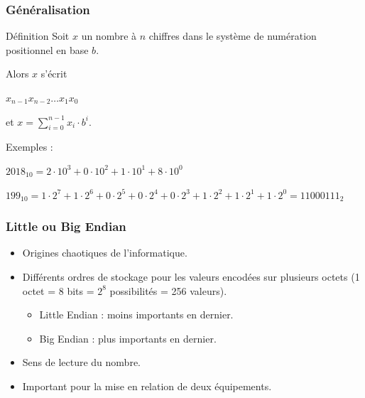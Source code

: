 	\frame
	{
		\frametitle{G\'en\'eralisation}
		\begin{block}{D\'efinition}
			Soit $x$ un nombre \`a $n$ chiffres dans le syst\`eme de num\'eration positionnel en base $b$.
			
			Alors $x$ s'\'ecrit
			
			$x_{n-1}x_{n-2}\ldots x_1x_0$
			
			et $x=\sum\limits_{i = 0}^{n-1}x_i\cdot b^i$.
		\end{block}
		
		Exemples :
		\begin{description}
			\item $2018_{10} = 2\cdot10^3 + 0\cdot10^2 + 1\cdot10^1+8\cdot10^0$
			\item $199_{10} = 1\cdot2^7 + 1\cdot2^6 + 0\cdot2^5+0\cdot2^4 + 0\cdot2^3 + 1\cdot2^2 + 1\cdot2^1+1\cdot2^0 = 11000111_2$
		\end{description}
	}

\frame
{
	\frametitle{Little ou Big Endian}
	\begin{itemize}
		\item Origines chaotiques de l'informatique.
		\item Diff\'erents ordres de stockage pour les valeurs encod\'ees sur plusieurs octets (1 octet = 8 bits = $2^8$ possibilit\'es = 256 valeurs).
		\begin{itemize}
			\item Little Endian : moins importants en dernier.
			\item Big Endian : plus importants en dernier.
		\end{itemize}
		\item Sens de lecture du nombre.
		\item Important pour la mise en relation de deux \'equipements.
	\end{itemize}
}


